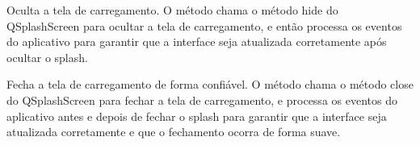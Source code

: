 \documentclass[letterpaper,10pt,english]{sphinxmanual}
\begin{document}
\begin{fulllineitems}
\begin{fulllineitems}
\begin{quote}
\begin{description}
\end{description}\end{quote}

\end{fulllineitems}


\begin{fulllineitems}
\label{\detokenize{api/loading_screen:loading_screen.LoadingScreen.hide}}
\pysigstartsignatures
\pysiglinewithargsret
{}
{}
{}
\pysigstopsignatures
\sphinxAtStartPar
Oculta a tela de carregamento. O método chama o método hide do QSplashScreen para ocultar a tela de carregamento, e então processa os eventos do aplicativo para garantir que a interface seja atualizada corretamente após ocultar o splash.
\begin{quote}\begin{description}
\sphinxAtStartPar
{}

\end{description}\end{quote}

\end{fulllineitems}


\begin{fulllineitems}
\label{\detokenize{api/loading_screen:loading_screen.LoadingScreen.close}}
\pysigstartsignatures
\pysiglinewithargsret
{}
{}
{}
\pysigstopsignatures
\sphinxAtStartPar
Fecha a tela de carregamento de forma confiável. O método chama o método close do QSplashScreen para fechar a tela de carregamento, e processa os eventos do aplicativo antes e depois de fechar o splash para garantir que a interface seja atualizada corretamente e que o fechamento ocorra de forma suave.
\begin{quote}\begin{description}
\sphinxAtStartPar
{}

\end{description}\end{quote}


\end{fulllineitems}
\end{fulllineitems}
\end{document}
